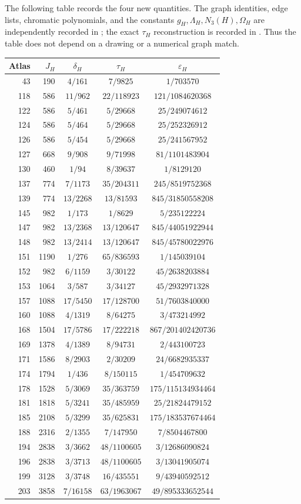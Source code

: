 \documentclass[11pt]{article}
\begin{document}
The following table records the four new quantities.  The graph identities,
edge lists, chromatic polynomials, and the constants
$g_H,\Lambda_H,N_3(H),\Omega_H$ are independently recorded in
; the exact
$\tau_H$ reconstruction is recorded in
.  Thus the table
does not depend on a drawing or a numerical graph match.

\small
\begin{longtable}{r@{\quad}r@{\quad}c@{\quad}c@{\quad}c}
Atlas&$J_H$&$\delta_H$&$\tau_H$&$\varepsilon_H$\\ \hline
43&190&$4/161$&$7/9825$&$1/703570$\\
118&586&$11/962$&$22/118923$&$121/1084620368$\\
122&586&$5/461$&$5/29668$&$25/249074612$\\
124&586&$5/464$&$5/29668$&$25/252326912$\\
126&586&$5/454$&$5/29668$&$25/241567952$\\
127&668&$9/908$&$9/71998$&$81/1101483904$\\
130&460&$1/94$&$8/39637$&$1/8129120$\\
137&774&$7/1173$&$35/204311$&$245/8519752368$\\
139&774&$13/2268$&$13/81593$&$845/31850558208$\\
145&982&$1/173$&$1/8629$&$5/235122224$\\
147&982&$13/2368$&$13/120647$&$845/44051922944$\\
148&982&$13/2414$&$13/120647$&$845/45780022976$\\
151&1190&$1/276$&$65/836593$&$1/145039104$\\
152&982&$6/1159$&$3/30122$&$45/2638203884$\\
153&1064&$3/587$&$3/34127$&$45/2932971328$\\
157&1088&$17/5450$&$17/128700$&$51/7603840000$\\
160&1088&$4/1319$&$8/64275$&$3/473214992$\\
168&1504&$17/5786$&$17/222218$&$867/201402420736$\\
169&1378&$4/1389$&$8/94731$&$2/443100723$\\
171&1586&$8/2903$&$2/30209$&$24/6682935337$\\
174&1794&$1/436$&$8/150115$&$1/454709632$\\
178&1528&$5/3069$&$35/363759$&$175/115134934464$\\
181&1818&$5/3241$&$35/485959$&$25/21824479152$\\
185&2108&$5/3299$&$35/625831$&$175/183537674464$\\
188&2316&$2/1355$&$7/147950$&$7/8504467800$\\
194&2838&$3/3662$&$48/1100605$&$3/12686090824$\\
196&2838&$3/3713$&$48/1100605$&$3/13041905074$\\
199&3128&$3/3748$&$16/435551$&$9/43940592512$\\
203&3858&$7/16158$&$63/1963067$&$49/895333652544$\\
\end{longtable}
\normalsize
\end{document}

